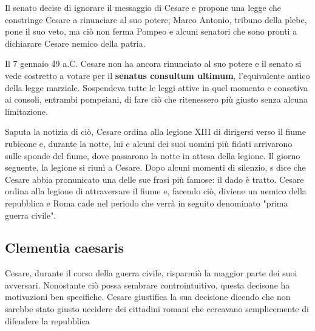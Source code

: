 \documentclass[10pt,a4paper]{article}
\begin{document}
Il senato decise di ignorare il messaggio di Cesare e propone una legge che constringe Cesare a rinunciare al suo potere; Marco Antonio, tribuno della plebe, pone il suo veto, ma ciò non ferma Pompeo e alcuni senatori che sono pronti a dichiarare Cesare nemico della patria.

Il 7 gennaio 49 a.C. Cesare non ha ancora rinunciato al suo potere e il senato si vede costretto a votare per il \textbf{senatus consultum ultimum}, l'equivalente antico della legge marziale. Sospendeva tutte le leggi attive in quel momento e consetiva ai consoli, entrambi pompeiani, di fare ciò che ritenessero più giusto senza alcuna limitazione.

Saputa la notizia di ciò, Cesare ordina alla legione XIII di dirigersi verso il fiume rubicone e, durante la notte, lui e alcuni dei suoi uomini più fidati arrivarono sulle sponde del fiume, dove passarono la notte in attesa della legione. Il giorno seguente, la legione si riunì a Cesare. Dopo alcuni momenti di silenzio, s dice che Cesare abbia pronunicato una delle sue frasi più famose: il dado è tratto. Cesare ordina alla legione di attraversare il fiume e, facendo ciò, diviene un nemico della repubblica e Roma cade nel periodo che verrà in seguito denominato "prima guerra civile".

\subsection{Clementia caesaris}

Cesare, durante il corso della guerra civile, risparmiò la maggior parte dei suoi avversari. Nonostante ciò possa sembrare controintuitivo, questa decisone ha motivazioni ben specifiche. Cesare giustifica la sua decisione dicendo che non sarebbe stato giusto uccidere dei cittadini romani che cercavano semplicemente di difendere la repubblica
\end{document}
